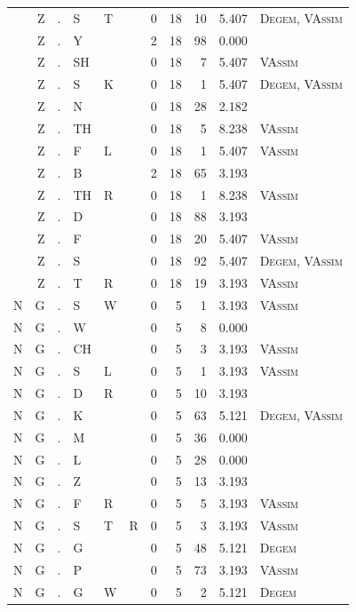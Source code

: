 \documentclass[12pt]{article}
\begin{document}
\begin{longtable}{r@{ } r@{ } c@{ } l@{ } l@{ } l@{ } r r r r l }
 & Z & . & S & T &  & 0 & 18 & 10 & 5.407 & \textsc{Degem}, \textsc{VAssim} \\
 & Z & . & Y &  &  & 2 & 18 & 98 & 0.000 &  \\
 & Z & . & SH &  &  & 0 & 18 & 7 & 5.407 & \textsc{VAssim} \\
 & Z & . & S & K &  & 0 & 18 & 1 & 5.407 & \textsc{Degem}, \textsc{VAssim} \\
 & Z & . & N &  &  & 0 & 18 & 28 & 2.182 &  \\
 & Z & . & TH &  &  & 0 & 18 & 5 & 8.238 & \textsc{VAssim} \\
 & Z & . & F & L &  & 0 & 18 & 1 & 5.407 & \textsc{VAssim} \\
 & Z & . & B &  &  & 2 & 18 & 65 & 3.193 &  \\
 & Z & . & TH & R &  & 0 & 18 & 1 & 8.238 & \textsc{VAssim} \\
 & Z & . & D &  &  & 0 & 18 & 88 & 3.193 &  \\
 & Z & . & F &  &  & 0 & 18 & 20 & 5.407 & \textsc{VAssim} \\
 & Z & . & S &  &  & 0 & 18 & 92 & 5.407 & \textsc{Degem}, \textsc{VAssim} \\
 & Z & . & T & R &  & 0 & 18 & 19 & 3.193 & \textsc{VAssim} \\
N & G & . & S & W &  & 0 & 5 & 1 & 3.193 & \textsc{VAssim} \\
N & G & . & W &  &  & 0 & 5 & 8 & 0.000 &  \\
N & G & . & CH &  &  & 0 & 5 & 3 & 3.193 & \textsc{VAssim} \\
N & G & . & S & L &  & 0 & 5 & 1 & 3.193 & \textsc{VAssim} \\
N & G & . & D & R &  & 0 & 5 & 10 & 3.193 &  \\
N & G & . & K &  &  & 0 & 5 & 63 & 5.121 & \textsc{Degem}, \textsc{VAssim} \\
N & G & . & M &  &  & 0 & 5 & 36 & 0.000 &  \\
N & G & . & L &  &  & 0 & 5 & 28 & 0.000 &  \\
N & G & . & Z &  &  & 0 & 5 & 13 & 3.193 &  \\
N & G & . & F & R &  & 0 & 5 & 5 & 3.193 & \textsc{VAssim} \\
N & G & . & S & T & R & 0 & 5 & 3 & 3.193 & \textsc{VAssim} \\
N & G & . & G &  &  & 0 & 5 & 48 & 5.121 & \textsc{Degem} \\
N & G & . & P &  &  & 0 & 5 & 73 & 3.193 & \textsc{VAssim} \\
N & G & . & G & W &  & 0 & 5 & 2 & 5.121 & \textsc{Degem} \\

\end{longtable}
\end{document}
